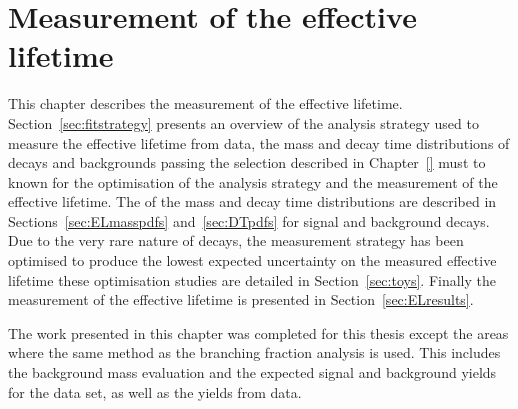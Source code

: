 \chapter{Measurement of the \bsmumu effective lifetime}
\label{sec:lifetimemeasurement}

This chapter describes the measurement of the \bsmumu effective lifetime.%
Section~\ref{sec:fitstrategy} presents an overview of the analysis strategy used to measure the \bsmumu effective lifetime from data, the mass and decay time distributions of \bsmumu decays and backgrounds passing the selection described in Chapter~\ref{} must to known for the optimisation of the analysis strategy and the measurement of the effective lifetime. The \pdfs of the mass and decay time distributions are described in Sections~\ref{sec:ELmasspdfs} and~\ref{sec:DTpdfs} for signal and background decays. Due to the very rare nature of \bsmumu decays, the measurement strategy has been optimised to produce the lowest expected uncertainty on the measured \bsmumu effective lifetime these optimisation studies are detailed in Section~\ref{sec:toys}. Finally the measurement of the \bsmumu effective lifetime is presented in Section~\ref{sec:ELresults}.





The work presented in this chapter was completed for this thesis except the areas where the same method as the branching fraction analysis is used. This includes the background mass \pdf evaluation and the expected signal and background yields for the data set, as well as the \bsjpisphi yields from data. 



